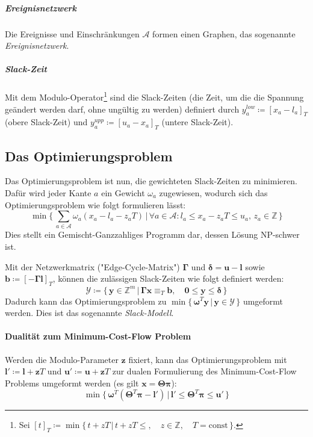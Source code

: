 \documentclass[a4paper, 10pt, twocolumn]{scrartcl}
\newcommand{\const}{\ensuremath{\textrm{const}}}
\newcommand{\Z}{\ensuremath{\mathbb{Z}}}
\newcommand{\mat}[1]{\boldsymbol{#1}}
\renewcommand{\vec}[1]{\boldsymbol{#1}}
\begin{document}
		\subparagraph{Ereignisnetzwerk}
		Die Ereignisse und Einschränkungen \( \mathcal{A} \) formen einen Graphen, das sogenannte \emph{Ereignisnetzwerk}.
		
		\subparagraph{Slack-Zeit}
		Mit dem Modulo-Operator\footnote{Sei \( [t]_T \coloneqq \min \{\, t + zT \,\vert\, t + zT \leq,\quad z \in \Z,\quad T = \const \,\} \).} sind die Slack-Zeiten (die Zeit, um die die Spannung geändert werden darf, ohne ungültig zu werden) definiert durch \( y_a^\mathit{low} \coloneqq [x_a - l_a]_T \) (obere Slack-Zeit) und \( y_a^\mathit{upp} \coloneqq [u_a - x_a]_T \) (untere Slack-Zeit).
		
	\subsection*{Das Optimierungsproblem}
		Das Optimierungsproblem ist nun, die gewichteten Slack-Zeiten zu minimieren. Dafür wird jeder Kante \( a \) ein Gewicht \( \omega_a \) zugewiesen, wodurch sich das Optimierungsproblem wie folgt formulieren lässt:
		{\small
		\begin{equation*}
			\min \Bigg\{\, \sum_{a \in \mathcal{A}} \omega_a (x_a - l_a - z_a T) \,\bigg\vert\, \forall a \in \mathcal{A} : l_a \leq x_a - z_a T \leq u_a,\, z_a \in \Z \,\Bigg\}
		\end{equation*}}
		Dies stellt ein Gemischt-Ganzzahliges Programm dar, dessen Lösung NP-schwer ist.
		
		Mit der Netzwerkmatrix ("Edge-Cycle-Matrix") \( \mat{\Gamma} \) und \( \vec{\delta} = \vec{u} - \vec{l} \) sowie \( \vec{b} \coloneqq [-\mat{\Gamma} \vec{l}]_T \), können die zulässigen Slack-Zeiten wie folgt definiert werden:
		\begin{equation*}
			\mathcal{Y} \coloneqq \big\{\, \vec{y} \in \Z^m \,\vert\, \mat{\Gamma} \vec{x} \equiv_T \vec{b},\quad \vec{0} \leq \vec{y} \leq \vec{\delta} \,\big\}
		\end{equation*}
		Dadurch kann das Optimierungsproblem zu \( \min \big\{\, \vec{\omega}^T \vec{y} \,\vert\, \vec{y} \in \mathcal{Y} \,\big\} \) umgeformt werden. Dies ist das sogenannte \emph{Slack-Modell}.
		
		\paragraph{Dualität zum Minimum-Cost-Flow Problem}
			Werden die Modulo-Parameter \( \vec{z} \) fixiert, kann das Optimierungsproblem mit \( \vec{l}' \coloneqq \vec{l} + \vec{z}T \) und \( \vec{u}' \coloneqq \vec{u} + \vec{z}T \) zur dualen Formulierung des Minimum-Cost-Flow Problems umgeformt werden (es gilt \( \vec{x} = \mat{\Theta} \vec{\pi} \)):
			\begin{equation*}
				\min \big\{\, \vec{\omega}^T (\mat{\Theta}^T \vec{\pi} - \vec{l}') \,\vert\, \vec{l}' \leq \mat{\Theta}^T \vec{\pi} \leq \vec{u}' \,\big\}
			\end{equation*}
			
\end{document}
